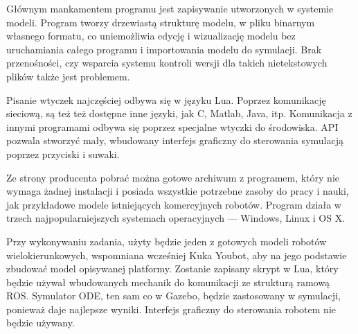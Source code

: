 	Głównym mankamentem programu jest zapisywanie utworzonych w systemie modeli.
	Program tworzy drzewiastą strukturę modelu, w pliku binarnym własnego formatu, co uniemożliwia edycję i wizualizację modelu bez uruchamiania całego programu 
	i importowania modelu do symulacji.
	Brak przenośności, czy wsparcia systemu kontroli wersji dla takich nietekstowych plików także jest problemem.

	Pisanie wtyczek najczęściej odbywa się w języku Lua. Poprzez komunikację sieciową, są też też dostępne inne języki, jak C, Matlab, Java, itp.
	Komunikacja z innymi programami odbywa się poprzez specjalne wtyczki do środowiska.
	API pozwala stworzyć mały, wbudowany interfejs graficzny do sterowania symulacją poprzez przyciski i suwaki.

	Ze strony producenta pobrać można gotowe archiwum z programem, który nie wymaga żadnej instalacji i posiada wszystkie potrzebne zasoby do pracy i nauki, 
	jak przykładowe modele istniejących komercyjnych robotów.
	Program działa w trzech najpopularniejszych systemach operacyjnych --- Windows, Linux i OS X.
	
	Przy wykonywaniu zadania, użyty będzie jeden z gotowych modeli robotów wielokierunkowych, wspomniana wcześniej Kuka Youbot, aby na jego podstawie zbudować model opisywanej platformy. Zostanie zapisany skrypt w Lua, który będzie używał wbudowanych mechanik do komunikacji ze strukturą ramową ROS. 
	Symulator ODE, ten sam co w Gazebo, będzie zastosowany w symulacji, ponieważ daje najlepsze wyniki. Interfejs graficzny do sterowania robotem nie będzie używany.

